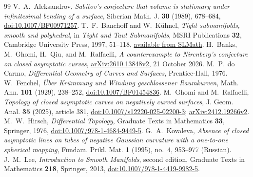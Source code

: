 \documentclass[11pt]{amsart}
\theoremstyle{definition}
\begin{document}
\clearpage
\begin{thebibliography}{99}
V.~A.~Aleksandrov,
\emph{Sabitov's conjecture that volume is stationary under infinitesimal
bending of a surface}, Siberian Math. J. \textbf{30} (1989), 678--684,
\href{https://doi.org/10.1007/BF00971257}{doi:10.1007/BF00971257}.
T.~F.~Banchoff and W.~K\"uhnel,
\emph{Tight submanifolds, smooth and polyhedral}, in
\emph{Tight and Taut Submanifolds}, MSRI Publications \textbf{32},
Cambridge University Press, 1997, 51--118,
\href{https://library.slmath.org/books/Book32/files/banchoff.pdf}{available from SLMath}.
H.~Banks, M.~Ghomi, H.~Qiu, and M.~Raffaelli,
\emph{A counterexample to Nirenberg's conjecture on closed asymptotic
curves}, \href{https://arxiv.org/abs/2610.13848v2}{arXiv:2610.13848v2},
21 October 2026.
M.~P.~do Carmo, \emph{Differential Geometry of Curves and Surfaces},
Prentice-Hall, 1976.
W.~Fenchel, \emph{\"Uber Kr\"ummung und Windung geschlossener Raumkurven},
Math. Ann. \textbf{101} (1929), 238--252,
\href{https://doi.org/10.1007/BF01454836}{doi:10.1007/BF01454836}.
M.~Ghomi and M.~Raffaelli,
\emph{Topology of closed asymptotic curves on negatively curved surfaces},
J. Geom. Anal. \textbf{35} (2025), article 381,
\href{https://doi.org/10.1007/s12220-025-02200-3}{doi:10.1007/s12220-025-02200-3};
\href{https://arxiv.org/abs/2412.19266v2}{arXiv:2412.19266v2}.
M.~W.~Hirsch, \emph{Differential Topology},
Graduate Texts in Mathematics \textbf{33}, Springer, 1976,
\href{https://doi.org/10.1007/978-1-4684-9449-5}{doi:10.1007/978-1-4684-9449-5}.
G.~A.~Kovaleva,
\emph{Absence of closed asymptotic lines on tubes of negative Gaussian
curvature with a one-to-one spherical mapping},
Fundam. Prikl. Mat. \textbf{1} (1995), no.~4, 953--977 (Russian).
J.~M.~Lee, \emph{Introduction to Smooth Manifolds}, second edition,
Graduate Texts in Mathematics \textbf{218}, Springer, 2013,
\href{https://doi.org/10.1007/978-1-4419-9982-5}{doi:10.1007/978-1-4419-9982-5}.
\end{thebibliography}
\end{document}
